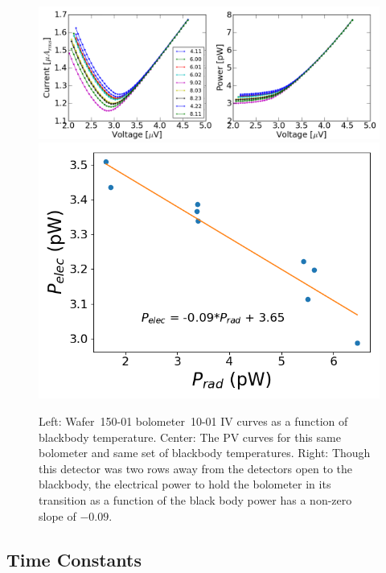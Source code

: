 \begin{figure}[htp]
\begin{center}
\includegraphics[width=0.65\columnwidth]{figures/SqCh7_Ch5_all_bb_curves.png}
\includegraphics[width=0.33\columnwidth]{figures/SqCh7_Ch5_p_vs_p.png}
\caption{Left: Wafer~150-01 bolometer~10-01 IV curves as a function of blackbody temperature. Center: The PV curves for this same bolometer and same set of blackbody temperatures. Right: Though this detector was two rows away from the detectors open to the blackbody, the electrical power to hold the bolometer in its transition as a function of the black body power has a non-zero slope of $-0.09$. 
\label{fig:dark_pelec_vs_popt} }
\end{center}
\end{figure}


%



\subsection{Time Constants}
\label{sec:time_constants}

